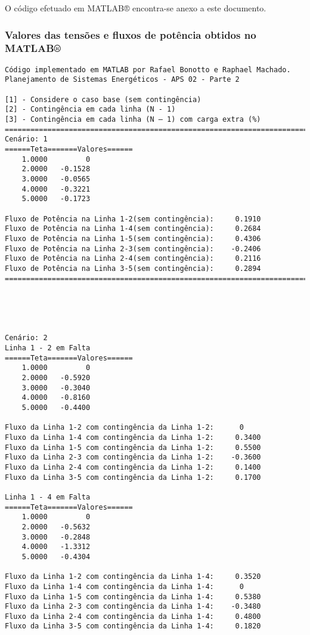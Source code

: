 	O código efetuado em MATLAB® encontra-se anexo a este documento.
	
\subsubsection{Valores das tensões e fluxos de potência obtidos no MATLAB®}
\begin{verbatim}
Código implementado em MATLAB por Rafael Bonotto e Raphael Machado.
Planejamento de Sistemas Energéticos - APS 02 - Parte 2

[1] - Considere o caso base (sem contingência)
[2] - Contingência em cada linha (N - 1)
[3] - Contingência em cada linha (N – 1) com carga extra (%)
=======================================================================
Cenário: 1
======Teta=======Valores======
    1.0000         0
    2.0000   -0.1528
    3.0000   -0.0565
    4.0000   -0.3221
    5.0000   -0.1723

Fluxo de Potência na Linha 1-2(sem contingência):     0.1910
Fluxo de Potência na Linha 1-4(sem contingência):     0.2684
Fluxo de Potência na Linha 1-5(sem contingência):     0.4306
Fluxo de Potência na Linha 2-3(sem contingência):    -0.2406
Fluxo de Potência na Linha 2-4(sem contingência):     0.2116
Fluxo de Potência na Linha 3-5(sem contingência):     0.2894
=======================================================================





Cenário: 2
Linha 1 - 2 em Falta
======Teta=======Valores======
    1.0000         0
    2.0000   -0.5920
    3.0000   -0.3040
    4.0000   -0.8160
    5.0000   -0.4400

Fluxo da Linha 1-2 com contingência da Linha 1-2:      0
Fluxo da Linha 1-4 com contingência da Linha 1-2:     0.3400
Fluxo da Linha 1-5 com contingência da Linha 1-2:     0.5500
Fluxo da Linha 2-3 com contingência da Linha 1-2:    -0.3600
Fluxo da Linha 2-4 com contingência da Linha 1-2:     0.1400
Fluxo da Linha 3-5 com contingência da Linha 1-2:     0.1700

Linha 1 - 4 em Falta
======Teta=======Valores======
    1.0000         0
    2.0000   -0.5632
    3.0000   -0.2848
    4.0000   -1.3312
    5.0000   -0.4304

Fluxo da Linha 1-2 com contingência da Linha 1-4:     0.3520
Fluxo da Linha 1-4 com contingência da Linha 1-4:      0
Fluxo da Linha 1-5 com contingência da Linha 1-4:     0.5380
Fluxo da Linha 2-3 com contingência da Linha 1-4:    -0.3480
Fluxo da Linha 2-4 com contingência da Linha 1-4:     0.4800
Fluxo da Linha 3-5 com contingência da Linha 1-4:     0.1820


\end{verbatim}
